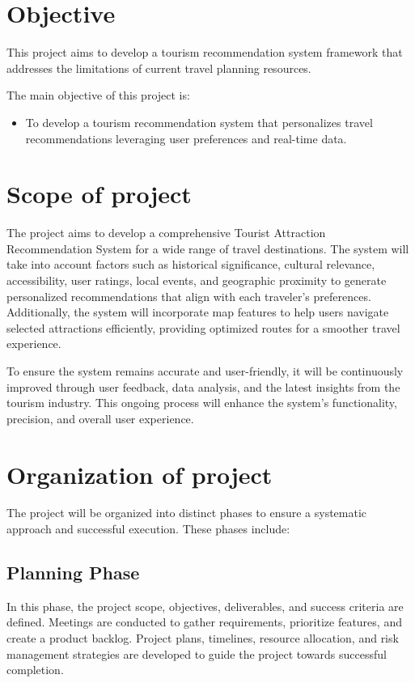             
\section{Objective}

    This project aims to develop a tourism recommendation system framework that addresses the limitations of current travel planning resources.
    
    The main objective of this project is:
    
    \begin{itemize}
    
    \item  To develop a tourism recommendation system that personalizes travel recommendations leveraging user preferences and real-time data.   

    \end{itemize}

\section{Scope of project}
    The project aims to develop a comprehensive Tourist Attraction Recommendation System for a wide range of travel destinations. The system will take into account factors such as historical significance, cultural relevance, accessibility, user ratings, local events, and geographic proximity to generate personalized recommendations that align with each traveler’s preferences. Additionally, the system will incorporate map features to help users navigate selected attractions efficiently, providing optimized routes for a smoother travel experience.

    To ensure the system remains accurate and user-friendly, it will be continuously improved through user feedback, data analysis, and the latest insights from the tourism industry. This ongoing process will enhance the system's functionality, precision, and overall user experience.
    
\section{Organization of project}
The project will be organized into distinct phases to ensure a systematic approach and successful execution. These phases include:

\subsection{Planning Phase}
In this phase, the project scope, objectives, deliverables, and success criteria are defined. Meetings are conducted to gather requirements, prioritize features, and create a product backlog. Project plans, timelines, resource allocation, and risk management strategies are developed to guide the project towards successful completion.

